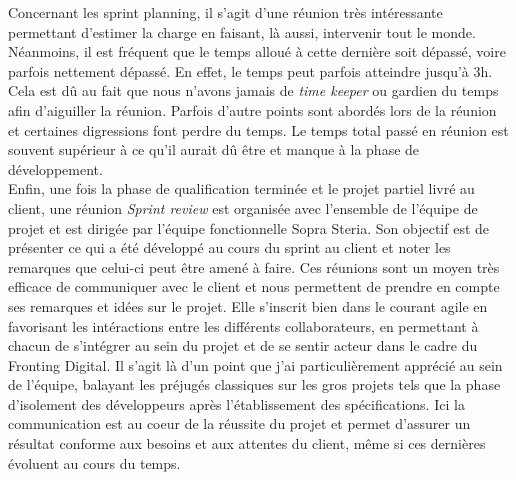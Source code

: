 	Concernant les sprint planning, il s'agit d'une réunion très intéressante permettant d'estimer la charge en faisant, là aussi, intervenir tout le monde. Néanmoins, il est fréquent que le temps alloué à cette dernière soit dépassé, voire parfois nettement dépassé. En effet, le temps peut parfois atteindre jusqu'à 3h. Cela est dû au fait que nous n'avons jamais de \textit{time keeper} ou gardien du temps afin d'aiguiller la réunion. Parfois d'autre points sont abordés lors de la réunion et certaines digressions font perdre du temps. Le temps total passé en réunion est souvent supérieur à ce qu'il aurait dû être et manque à la phase de développement. \\
	
	Enfin, une fois la phase de qualification terminée et le projet partiel livré au client, une réunion \textit{Sprint review} est organisée avec l'ensemble de l'équipe de projet et est dirigée par l'équipe fonctionnelle Sopra Steria. Son objectif est de présenter ce qui a été développé au cours du sprint au client et noter les remarques que celui-ci peut être amené à faire. Ces réunions sont un moyen très efficace de communiquer avec le client et nous permettent de prendre en compte ses remarques et idées sur le projet. Elle s'inscrit bien dans le courant agile en favorisant les intéractions entre les différents collaborateurs, en permettant à chacun de s'intégrer au sein du projet et de se sentir acteur dans le cadre du Fronting Digital. Il s'agit là d'un point que j'ai particulièrement apprécié au sein de l'équipe, balayant les préjugés classiques sur les gros projets tels que la phase d'isolement des développeurs après l'établissement des spécifications. Ici la communication est au coeur de la réussite du projet et permet d'assurer un résultat conforme aux besoins et aux attentes du client, même si ces dernières évoluent au cours du temps.